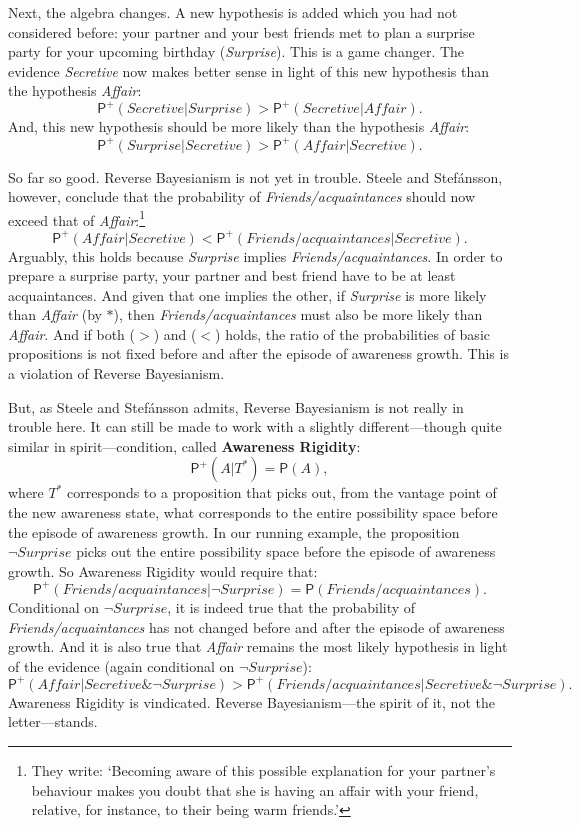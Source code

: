 \documentclass[
  11pt,
  dvipsnames,enabledeprecatedfontcommands]{scrartcl}
\newcommand{\pr}[1]{\ensuremath{\mathsf{P}(#1)}}
\newcommand{\ppr}[2]{\ensuremath{\mathsf{P}^{#1}(#2)}}
\begin{document}
Next, the algebra changes. A new hypothesis is added which you had not
considered before: your partner and your best friends met to plan a
surprise party for your upcoming birthday (\textit{Surprise}). This is a
game changer. The evidence \textit{Secretive} now makes better sense in
light of this new hypothesis than the hypothesis \textit{Affair}:
\[\ppr{+}{ \textit{Secretive} \vert \textit{Surprise}}> \ppr{+}{\textit{Secretive} \vert \textit{Affair}}.\]
And, this new hypothesis should be more likely than the hypothesis
\textit{Affair}:
\[\ppr{+}{ \textit{Surprise} \vert \textit{Secretive}}> \ppr{+}{ \textit{Affair} \vert \textit{Secretive}}. \tag{*}\]

So far so good. Reverse Bayesianism is not yet in trouble. Steele and
Stefánsson, however, conclude that the probability of
\textit{Friends/acquaintances} should now exceed that of
\textit{Affair}:\footnote{They write: `Becoming aware of this possible
  explanation for your partner's behaviour makes you doubt that she is
  having an affair with your friend, relative, for instance, to their
  being warm friends.'}
\[\ppr{+}{\textit{Affair} \vert  \textit{Secretive} } < \ppr{+}{\textit{Friends/acquaintances} \vert \textit{Secretive}}. \tag{<}\]
Arguably, this holds because \textit{Surprise} implies
\textit{Friends/acquaintances}. In order to prepare a surprise party,
your partner and best friend have to be at least acquaintances. And
given that one implies the other, if \textit{Surprise} is more likely
than \textit{Affair} (by \(*\)), then \textit{Friends/acquaintances}
must also be more likely than \textit{Affair}. And if both (\(>\)) and
(\(<\)) holds, the ratio of the probabilities of basic propositions is
not fixed before and after the episode of awareness growth. This is a
violation of Reverse Bayesianism.

But, as Steele and Stefánsson admits, Reverse Bayesianism is not really
in trouble here. It can still be made to work with a slightly
different---though quite similar in spirit---condition, called
\textbf{Awareness Rigidity}: \[\ppr{+}{A \vert T^*}=\pr{A},\] where
\(T^*\) corresponds to a proposition that picks out, from the vantage
point of the new awareness state, what corresponds to the entire
possibility space before the episode of awareness growth. In our running
example, the proposition \(\neg\textit{Surprise}\) picks out the entire
possibility space before the episode of awareness growth. So Awareness
Rigidity would require that:
\[\ppr{+}{\textit{Friends/acquaintances} \vert \neg\textit{Surprise}}=\pr{\textit{Friends/acquaintances}}.\]
Conditional on \(\neg\textit{Surprise}\), it is indeed true that the
probability of \textit{Friends/acquaintances} has not changed before and
after the episode of awareness growth. And it is also true that
\textit{Affair} remains the most likely hypothesis in light of the
evidence (again conditional on \(\neg\textit{Surprise}\)):
\[\ppr{+}{\textit{Affair} \vert  \textit{Secretive} \& \neg\textit{Surprise} } > \ppr{+}{\textit{Friends/acquaintances} \vert \textit{Secretive} \& \neg\textit{Surprise}}. \tag{$>^+$}\]
Awareness Rigidity is vindicated. Reverse Bayesianism---the spirit of
it, not the letter---stands.
\end{document}
